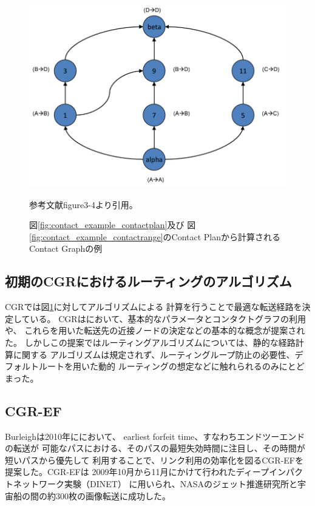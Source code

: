 \begin{figure}[tbh]
    \centering
    \includegraphics[width=0.5\textheight]{img/contact_example_contactgraph.pdf}
    \caption{図\ref{fig:contact_example_contactplan}及び
    図\ref{fig:contact_example_contactrange}のContact Planから計算されるContact Graphの例}
    \label{fig:contact_example_contactgraph}
    \begin{minipage}{\textwidth}
        \centering
        \vspace{3mm}
        参考文献\cite{schedule_aware_bundle_routing}figure3-4より引用。
    \end{minipage}
\end{figure}
\label{chap:related_works}


\subsection{初期のCGRにおけるルーティングのアルゴリズム}
\label{subsection:宇宙インターネットにおけるルーティングのアルゴリズム}    
CGRでは図\ref{fig:contact_example_contactgraph}に対してアルゴリズムによる
計算を行うことで最適な転送経路を決定している。
CGRは\cite{Burleigh2008}において、基本的なパラメータとコンタクトグラフの利用や、
これらを用いた転送先の近接ノードの決定などの基本的な概念が提案された。
しかしこの提案ではルーティングアルゴリズムについては、静的な経路計算に関する
アルゴリズムは規定されず、ルーティングループ防止の必要性、デフォルトルートを用いた動的
ルーティングの想定などに触れられるのみにとどまった。

\subsection{CGR-EF}
\label{subsection:CGR-EF}
Burleighは2010年に\cite{burleigh-dtnrg-cgr-01}において、
earliest forfeit time、すなわちエンドツーエンドの転送が
可能なパスにおける、そのパスの最短失効時間に注目し、その時間が短いパスから優先して
利用することで、リンク利用の効率化を図るCGR-EFを提案した。CGR-EFは
2009年10月から11月にかけて行われたディープインパクトネットワーク実験（DINET）
\cite{JPL2009}に用いられ、NASAのジェット推進研究所と宇宙船の間の約300枚の画像転送に成功した。

